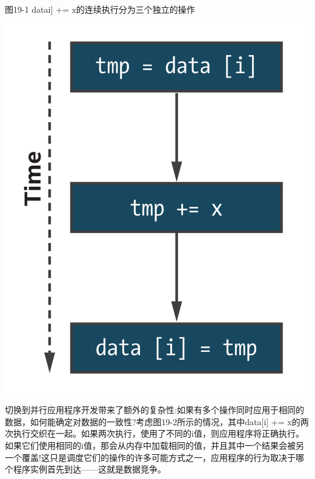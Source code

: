 \hspace*{\fill} \par %
图19-1 datai] += x的连续执行分为三个独立的操作
\begin{center}
	\includegraphics[width=1.0\textwidth]{content/chapter-19/images/2}
\end{center}

切换到并行应用程序开发带来了额外的复杂性:如果有多个操作同时应用于相同的数据，如何能确定对数据的一致性?考虑图19-2所示的情况，其中data[i] += x的两次执行交织在一起。如果两次执行，使用了不同的i值，则应用程序将正确执行。如果它们使用相同的i值，那会从内存中加载相同的值，并且其中一个结果会被另一个覆盖!这只是调度它们的操作的许多可能方式之一，应用程序的行为取决于哪个程序实例首先到达——这就是数据竞争。\par

